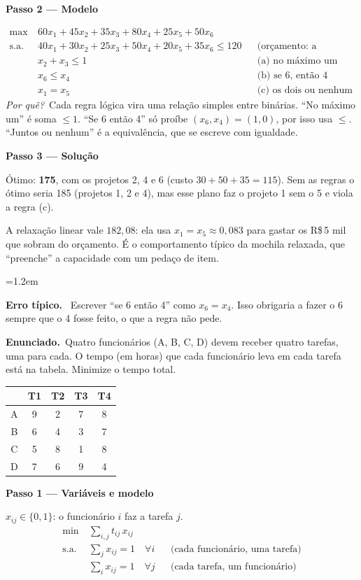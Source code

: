 \documentclass[11pt,a4paper]{article}
\newcommand{\enunciado}{\par\textbf{Enunciado.}\ }
\newcommand{\passo}[1]{\par\medskip\textbf{#1}\par}
\newcommand{\porque}{\textit{Por quê?}\ }
\newenvironment{nota}[1]{\par\smallskip\begin{list}{}{\leftmargin=1.2em\rightmargin=0pt}\item[]\textbf{#1.}\ }{\end{list}}
\begin{document}
\passo{Passo 2 --- Modelo}
\begin{align*}
  \max\ & 60x_1 + 45x_2 + 35x_3 + 80x_4 + 25x_5 + 50x_6\\
  \text{s.a.}\ & 40x_1 + 30x_2 + 25x_3 + 50x_4 + 20x_5 + 35x_6 \le 120 && \text{(orçamento: a ``mochila'')}\\
  & x_2 + x_3 \le 1 && \text{(a) no máximo um}\\
  & x_6 \le x_4 && \text{(b) se 6, então 4}\\
  & x_1 = x_5 && \text{(c) os dois ou nenhum}
\end{align*}
\porque Cada regra lógica vira uma relação simples entre binárias. ``No máximo um'' é soma $\le1$. ``Se 6 então 4'' só
proíbe $(x_6,x_4)=(1,0)$, por isso usa $\le$. ``Juntos ou nenhum'' é a equivalência, que se escreve com igualdade.

\passo{Passo 3 --- Solução}
Ótimo: \textbf{175}, com os projetos 2, 4 e 6 (custo $30+50+35=115$). Sem as regras o ótimo seria 185 (projetos 1, 2 e 4),
mas esse plano faz o projeto 1 sem o 5 e viola a regra (c).

A relaxação linear vale $182{,}08$: ela usa $x_1=x_5\approx0{,}083$ para gastar os R\$\,5 mil que sobram do orçamento.
É o comportamento típico da mochila relaxada, que ``preenche'' a capacidade com um pedaço de item.

\begin{nota}{Erro típico}
Escrever ``se 6 então 4'' como $x_6=x_4$. Isso obrigaria a fazer o 6 sempre que o 4 fosse feito, o que a regra não pede.
\end{nota}

\enunciado Quatro funcionários (A, B, C, D) devem receber quatro tarefas, uma para cada. O tempo (em horas) que cada
funcionário leva em cada tarefa está na tabela. Minimize o tempo total.
\begin{center}
\begin{tabular}{c|cccc}
\toprule
 & T1 & T2 & T3 & T4\\
\midrule
A & 9 & 2 & 7 & 8\\
B & 6 & 4 & 3 & 7\\
C & 5 & 8 & 1 & 8\\
D & 7 & 6 & 9 & 4\\
\bottomrule
\end{tabular}
\end{center}

\passo{Passo 1 --- Variáveis e modelo}
$x_{ij}\in\{0,1\}$: o funcionário $i$ faz a tarefa $j$.
\begin{align*}
  \min\ & \sum_{i,j} t_{ij}\,x_{ij}\\
  \text{s.a.}\ & \sum_j x_{ij} = 1 \quad\forall i && \text{(cada funcionário, uma tarefa)}\\
  & \sum_i x_{ij} = 1 \quad\forall j && \text{(cada tarefa, um funcionário)}
\end{align*}
\end{document}
